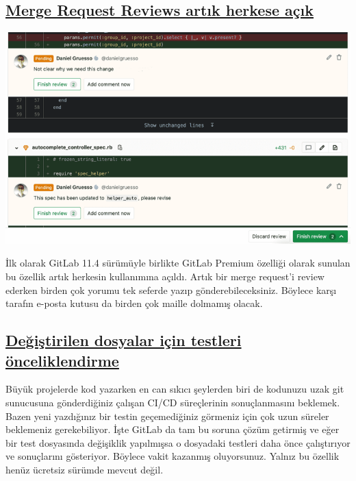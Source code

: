 \documentclass[11pt]{article}
\begin{document}
\subsection{\href{https://about.gitlab.com/releases/2020/06/22/gitlab-13-1-released/\#merge-request-reviews-moved-to-core}{Merge Request Reviews artık herkese açık}}
\label{sec:org38c70d9}
\begin{center}
\includegraphics[width=.9\linewidth]{gorseller/gitlab-merge-request-reviews.png}
\end{center}

İlk olarak GitLab 11.4 sürümüyle birlikte GitLab Premium özelliği olarak
sunulan bu özellik artık herkesin kullanımına açıldı. Artık bir merge
request'i review ederken birden çok yorumu tek seferde yazıp
gönderebileceksiniz. Böylece karşı tarafın e-posta kutusu da birden çok
maille dolmamış olacak.
\subsection{\href{https://about.gitlab.com/releases/2020/06/22/gitlab-13-1-released/\#run-tests-for-modified-files-first}{Değiştirilen dosyalar için testleri önceliklendirme}}
\label{sec:org137bee5}
Büyük projelerde kod yazarken en can sıkıcı şeylerden biri de kodunuzu uzak
git sunucusuna gönderdiğiniz çalışan CI/CD süreçlerinin sonuçlanmasını
beklemek. Bazen yeni yazdığınız bir testin geçemediğiniz görmeniz için çok
uzun süreler beklemeniz gerekebiliyor. İşte GitLab da tam bu soruna çözüm
getirmiş ve eğer bir test dosyasında değişiklik yapılmışsa o dosyadaki
testleri daha önce çalıştırıyor ve sonuçlarını gösteriyor. Böylece vakit
kazanmış oluyorsunuz. Yalnız bu özellik henüz ücretsiz sürümde mevcut değil.
\end{document}
